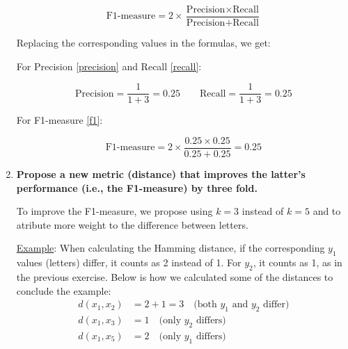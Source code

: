 \documentclass[12pt]{article}
\begin{document}
\begin{enumerate}[leftmargin=\labelsep]
    \begin{equation}\label{f1}
        \text{F1-measure} = 2 \times \frac{{\text{Precision} \times \text{Recall}}}{{\text{Precision} + \text{Recall}}}
    \end{equation}

    \vspace{10pt}
    Replacing the corresponding values in the formulas, we get:

    \vspace{10pt}
    For Precision \eqref{precision} and Recall \eqref{recall}:

    \begin{equation*}
        \text{Precision} = \frac{1}{1 + 3} = 0.25 \quad \quad
        \text{Recall} = \frac{1}{1 + 3} = 0.25
    \end{equation*}

    For F1-measure \eqref{f1}:

    \begin{equation*}
        \text{F1-measure} = 2 \times \frac{0.25 \times 0.25}{0.25 + 0.25} = 0.25
    \end{equation*}

    \newpage
    \item \textbf{Propose a new metric (distance) that improves the latter's performance (i.e., the
    F1-measure) by three fold.} 
    
    \vspace{10pt}
    
    To improve the F1-measure, we propose using $k=3$ instead of $k=5$ and to atribute more weight to the difference between letters. 
    
    \vspace{10pt}
    \underline{Example}: When calculating the Hamming distance, if the corresponding $y_1$ values (letters) differ, it counts as 2 instead of 1. For $y_2$, it counts as 1, as in the previous exercise. Below is how we calculated some of the distances to conclude the example:
    \vspace{10pt}
    \begin{align*}
        d(x_1, x_2) &= 2 + 1 = 3 \quad \text{(both } y_1 \text{ and } y_2 \text{ differ)} \\
        d(x_1, x_3) &= 1 \quad \text{(only } y_2 \text{ differs)} \\
        d(x_1, x_5) &= 2 \quad \text{(only } y_1 \text{ differs)}
    \end{align*}
    

\end{enumerate}
\end{document}
